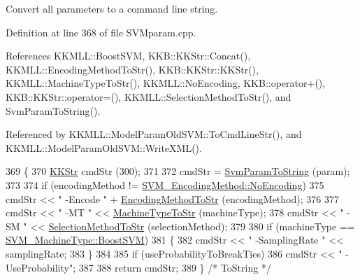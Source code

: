 Convert all parameters to a command line string. 



Definition at line 368 of file S\+V\+Mparam.\+cpp.



References K\+K\+M\+L\+L\+::\+Boost\+S\+VM, K\+K\+B\+::\+K\+K\+Str\+::\+Concat(), K\+K\+M\+L\+L\+::\+Encoding\+Method\+To\+Str(), K\+K\+B\+::\+K\+K\+Str\+::\+K\+K\+Str(), K\+K\+M\+L\+L\+::\+Machine\+Type\+To\+Str(), K\+K\+M\+L\+L\+::\+No\+Encoding, K\+K\+B\+::operator+(), K\+K\+B\+::\+K\+K\+Str\+::operator=(), K\+K\+M\+L\+L\+::\+Selection\+Method\+To\+Str(), and Svm\+Param\+To\+String().



Referenced by K\+K\+M\+L\+L\+::\+Model\+Param\+Old\+S\+V\+M\+::\+To\+Cmd\+Line\+Str(), and K\+K\+M\+L\+L\+::\+Model\+Param\+Old\+S\+V\+M\+::\+Write\+X\+M\+L().


\begin{DoxyCode}
369 \{
370   \hyperlink{class_k_k_b_1_1_k_k_str}{KKStr}  cmdStr (300);
371 
372   cmdStr = \hyperlink{class_k_k_m_l_l_1_1_s_v_mparam_a2c79ac20378aedbddf889c356bc3f1bf}{SvmParamToString} (param);
373 
374   \textcolor{keywordflow}{if}  (encodingMethod != \hyperlink{namespace_k_k_m_l_l_a1994af1d94ca5bf6e27f0cf803a8d64ca3f6e102acead54bbbf4c704dd88fb94b}{SVM\_EncodingMethod::NoEncoding})
375     cmdStr << \textcolor{stringliteral}{"  -Encode "} + \hyperlink{namespace_k_k_m_l_l_ad6a1e63c0b52f7236e41cee6ce834273}{EncodingMethodToStr} (encodingMethod);
376 
377   cmdStr << \textcolor{stringliteral}{"  -MT "} << \hyperlink{namespace_k_k_m_l_l_ae41cf90293bf19b13fbeeb4dcefa09eb}{MachineTypeToStr} (machineType);
378   cmdStr << \textcolor{stringliteral}{"  -SM "} << \hyperlink{namespace_k_k_m_l_l_a836f83cedfbe3985d00997edec28716f}{SelectionMethodToStr} (selectionMethod);
379 
380   \textcolor{keywordflow}{if}  (machineType == \hyperlink{namespace_k_k_m_l_l_ad917464bc631109a3021cf02cd27af9aac50f90b00bf6f5751f531c1a09093684}{SVM\_MachineType::BoostSVM})
381   \{
382     cmdStr << \textcolor{stringliteral}{"  -SamplingRate "} << samplingRate;
383   \}
384 
385   \textcolor{keywordflow}{if}  (useProbabilityToBreakTies)
386     cmdStr << \textcolor{stringliteral}{"  -UseProbability"};
387 
388   \textcolor{keywordflow}{return}  cmdStr;
389 \}  \textcolor{comment}{/* ToString */}
\end{DoxyCode}
